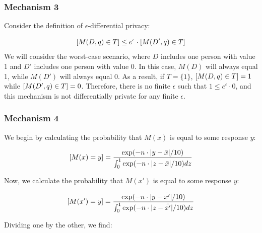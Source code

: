 \documentclass[12pt]{article}
\let\Pr\relax
\DeclareMathOperator*{\Pr}{\mathbb{P}}
\begin{document}
\subsubsection*{Mechanism 3}

\noindent

Consider the definition of $\epsilon$-differential privacy:

$$\Pr[M(D, q) \in T] \leq e^\epsilon \cdot \Pr[M(D', q) \in T]$$
We will consider the worst-case scenario, where $D$ includes one person with value 1 and $D'$ includes one person with value 0. In this case, $M(D)$ will always equal 1, while $M(D')$ will always equal 0. As a result, if $T = \{1\}$, $\Pr[M(D, q) \in T] = 1$ while $\Pr[M(D', q) \in T] = 0$. Therefore, there is no finite $\epsilon$ such that $1 \leq e^\epsilon \cdot 0$, and this mechanism is not differentially private for any finite $\epsilon$.

\subsubsection*{Mechanism 4}

\noindent

We begin by calculating the probability that $M(x)$ is equal to some response $y$:

\begin{align*}
\Pr[M(x) = y] &= \frac{\exp(-n \cdot |y - \bar{x}|/10)}{\int_0^1 \exp(-n \cdot |z-\bar{x}|/10) dz} \\
\end{align*}

Now, we calculate the probability that $M(x')$ is equal to some response $y$:

\begin{align*}
\Pr[M(x') = y] &= \frac{\exp(-n \cdot |y - \bar{x'}|/10)}{\int_0^1 \exp(-n \cdot |z-\bar{x'}|/10) dz} \\
\end{align*}

Dividing one by the other, we find:
\end{document}
